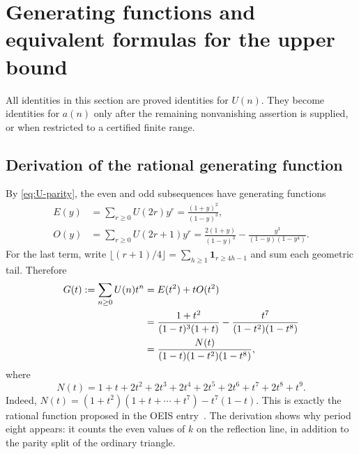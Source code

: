 \documentclass[11pt]{article}
\numberwithin{equation}{section}
\theoremstyle{definition}
\theoremstyle{remark}
\newcommand{\U}{U}
\begin{document}
\section{Generating functions and equivalent formulas for the upper bound}
\label{sec:gf}
All identities in this section are proved identities for $\U(n)$.
They become identities for $a(n)$ only after the remaining nonvanishing
assertion is supplied, or when restricted to a certified finite range.

\subsection{Derivation of the rational generating function}
By \eqref{eq:U-parity}, the even and odd subsequences have generating
functions
\begin{align}
 E(y)&=\sum_{r\ge0}\U(2r)y^r
       =\frac{(1+y)^2}{(1-y)^3},\label{eq:E}\\
 O(y)&=\sum_{r\ge0}\U(2r+1)y^r
       =\frac{2(1+y)}{(1-y)^3}
          -\frac{y^3}{(1-y)(1-y^4)}.\label{eq:O}
\end{align}
For the last term, write
$\lfloor(r+1)/4\rfloor=\sum_{h\ge1}\mathbf1_{r\ge4h-1}$ and sum each
geometric tail. Therefore
\begin{align}
 G(t):=\sum_{n\ge0}\U(n)t^n
 &=E(t^2)+tO(t^2)\notag\\
 &=\frac{1+t^2}{(1-t)^3(1+t)}
       -\frac{t^7}{(1-t^2)(1-t^8)}\notag\\
 &=\frac{N(t)}{(1-t)(1-t^2)(1-t^8)},\label{eq:GF}
\end{align}
where
\begin{equation}\label{eq:N}
 N(t)=1+t+2t^2+2t^3+2t^4+2t^5+2t^6+t^7+2t^8+t^9.
\end{equation}
Indeed,
$N(t)=(1+t^2)(1+t+\cdots+t^7)-t^7(1-t)$.
This is exactly the rational function proposed in the OEIS entry~\cite{oeis}.
The derivation shows why period eight appears: it counts the even values
of $k$ on the reflection line, in addition to the parity split of the
ordinary triangle.
\end{document}
